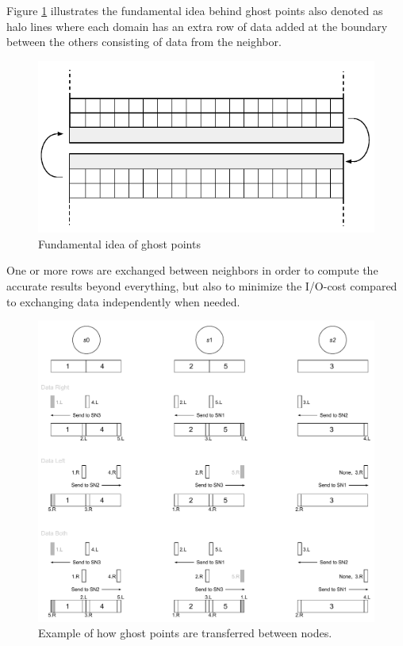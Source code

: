 Figure \ref{fig:ghost-points} illustrates the fundamental idea behind ghost points also denoted as halo lines where each domain has an extra row of data added at the boundary between the others consisting of data from the neighbor. 

\begin{figure}[ht!]
	\centering
	\includegraphics[scale=0.92]{pdf/ghost-points.pdf}
	\vspace*{3mm}
	\caption{Fundamental idea of ghost points \label{fig:ghost-points}}
	\vspace{2mm}
\end{figure}	

One or more rows are exchanged between neighbors in order to compute the accurate results beyond everything, but also to minimize the I/O-cost compared to exchanging data independently when needed.
\newline

\begin{figure}[ht!]
\centering
\vspace*{6mm}
\includegraphics[scale=0.55]{pdf/ghost-transfer.pdf}
\vspace*{4mm}
\caption[Ghost transfer example]{Example of how ghost points are transferred between nodes.}
\vspace*{6mm}
\label{fig:ghost-transfer}
\end{figure}

